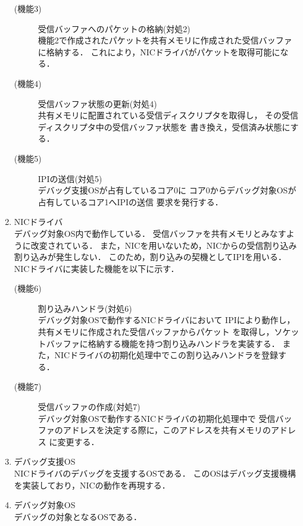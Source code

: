 \documentclass[tanilab-enum]{graduate}
\begin{document}
\begin{enumerate}
\begin{description}
            \item[(機能3)]受信バッファへのパケットの格納(対処2)\\
                機能2で作成されたパケットを共有メモリに作成された受信バッファに格納する．
                これにより，NICドライバがパケットを取得可能になる．
            \item[(機能4)]受信バッファ状態の更新(対処4)\\
                共有メモリに配置されている受信ディスクリプタを取得し，
                その受信ディスクリプタ中の受信バッファ状態を
                書き換え，受信済み状態にする．
            \item[(機能5)]IPIの送信(対処5)\\
                デバッグ支援OSが占有しているコア0に
                コア0からデバッグ対象OSが占有しているコア1へIPIの送信
                要求を発行する．
        \end{description}
    \item NICドライバ\\
        デバッグ対象OS内で動作している．
        受信バッファを共有メモリとみなすように改変されている．
        また，NICを用いないため，NICからの受信割り込み割り込みが発生しない．
        このため，割り込みの契機としてIPIを用いる．
        NICドライバに実装した機能を以下に示す．
        \begin{description}
            \item[(機能6)]割り込みハンドラ(対処6)\\
                デバッグ対象OSで動作するNICドライバにおいて
                IPIにより動作し，共有メモリに作成された受信バッファからパケット
                を取得し，ソケットバッファに格納する機能を持つ割り込みハンドラを実装する．
                また，NICドライバの初期化処理中でこの割り込みハンドラを登録する．
            \item[(機能7)]受信バッファの作成(対処7)\\
                デバッグ対象OSで動作するNICドライバの初期化処理中で
                受信バッファのアドレスを決定する際に，このアドレスを共有メモリのアドレス
                に変更する．
        \end{description}
    \item デバッグ支援OS\\
        NICドライバのデバッグを支援するOSである．
        このOSはデバッグ支援機構を実装しており，NICの動作を再現する．
    \item デバッグ対象OS\\
        デバッグの対象となるOSである．

\end{enumerate}
\end{document}
